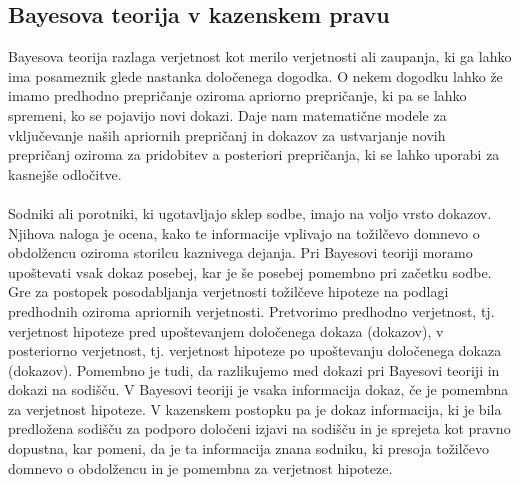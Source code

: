 \documentclass[12pt,a4paper]{amsart}
\theoremstyle{definition} %
\theoremstyle{plain} %
\begin{document}
\subsection{Bayesova teorija v kazenskem pravu}
Bayesova teorija razlaga verjetnost kot merilo verjetnosti ali zaupanja, ki ga lahko ima posameznik glede nastanka določenega dogodka.
O nekem dogodku lahko že imamo predhodno prepričanje oziroma apriorno prepričanje, ki pa se lahko spremeni, ko se pojavijo novi dokazi. Daje nam
matematične modele za vključevanje naših apriornih prepričanj in dokazov za ustvarjanje novih prepričanj oziroma za pridobitev a posteriori
prepričanja, ki se lahko uporabi za kasnejše odločitve.\\\\
Sodniki ali porotniki, ki ugotavljajo sklep sodbe, imajo na voljo vrsto dokazov. Njihova naloga je ocena, kako te informacije vplivajo na tožilčevo
domnevo o obdolžencu oziroma storilcu kaznivega dejanja. Pri Bayesovi teoriji moramo upoštevati vsak dokaz posebej, kar je še posebej pomembno pri
začetku sodbe. Gre za postopek posodabljanja verjetnosti tožilčeve hipoteze na podlagi predhodnih oziroma apriornih verjetnosti. Pretvorimo predhodno
verjetnost, tj. verjetnost hipoteze pred upoštevanjem določenega dokaza (dokazov), v posteriorno verjetnost, tj. verjetnost hipoteze po upoštevanju
določenega dokaza (dokazov). Pomembno je tudi, da razlikujemo med dokazi pri Bayesovi teoriji in dokazi na sodišču. V Bayesovi teoriji je vsaka informacija
dokaz, če je pomembna za verjetnost hipoteze. V kazenskem postopku pa je dokaz informacija, ki je bila predložena sodišču za podporo določeni
izjavi na sodišču in je sprejeta kot pravno dopustna, kar pomeni, da je ta informacija znana sodniku, ki presoja tožilčevo domnevo o obdolžencu in je
pomembna za verjetnost hipoteze.

\end{document}

